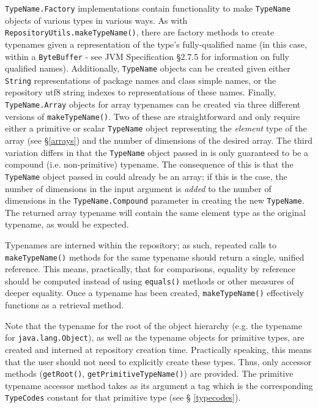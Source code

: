 \documentclass{report}
\begin{document}
\texttt{TypeName.Fac\-tory} implementations contain functionality
to make \texttt{TypeName} objects of various types in various ways.
As with \texttt{Re\-pos\-i\-tory\-Utils.make\-Type\-Name()}, there are factory 
methods to create typenames given a representation of the type's 
fully-qualified name (in this case, within a \texttt{Byte\-Buff\-er} - see JVM 
Specification \S 2.7.5 for information on fully qualified names). Additionally,
\texttt{TypeName} objects can be created given either \texttt{String}
representations of package names and class simple names, or the
repository utf8 string indexes to representations of these names.
Finally, \texttt{TypeName.Array} objects for array typenames can be
created via three different versions of \texttt{make\-Type\-Name()}.
Two of these are straightforward and only require either a primitive or scalar
\texttt{TypeName} object representing the {\em element} type of the array
(see \S \ref{arrays}) and the number of dimensions of the desired
array. The third variation differs in that the \texttt{TypeName} object
passed in is only guaranteed to be a compound (i.e. non-primitive)
typename. The consequence of this is that the \texttt{TypeName} object
passed in could already be an array; if this is the case, the number
of dimensions in the input argument is {\em added} to the number
of dimensions in the \texttt{TypeName.Compound} parameter in creating
the new \texttt{TypeName}. The returned array typename will contain the
same element type as the original typename, as would be expected.

Typenames are interned within the repository; as such, repeated calls
to \texttt{make\-Type\-Name()} methods for the same typename should return a
single, unified reference. This means, practically, that for comparisons,
equality by reference should be computed instead of using \texttt{equals()}
methods or other measures of deeper equality. Once a typename has been created,
\texttt{make\-Type\-Name()} effectively functions as a retrieval method.

Note that the typename for the root of the object hierarchy (e.g.
the typename for \texttt{java.lang.Object}), as well as the typename objects
for primitive types, are created and interned at repository creation time.
Practically speaking, this means that the user should not need to explicitly
create these types. Thus, only accessor methods (\texttt{getRoot()},
\texttt{getPrimitiveTypeName()}) are provided. The primitive typename accessor
method takes as its argument a tag which is the corresponding
\texttt{TypeCodes} constant for that primitive type (see \S
\ref{typecodes}).
\end{document}
